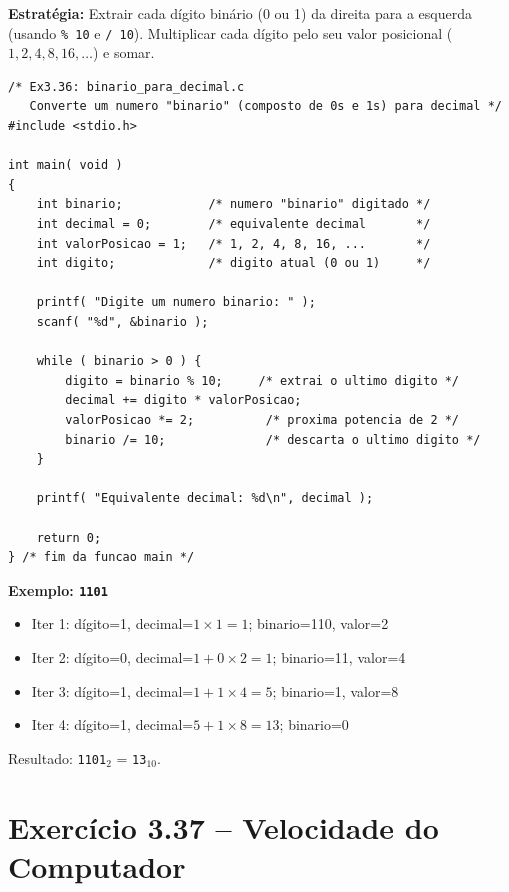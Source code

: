 \documentclass[12pt,a4paper]{article}
\begin{document}
\begin{respostabox}
\textbf{Estratégia:} Extrair cada dígito binário (0 ou 1) da direita para a esquerda
(usando \texttt{\% 10} e \texttt{/ 10}). Multiplicar cada dígito pelo seu valor
posicional ($1, 2, 4, 8, 16, \ldots$) e somar.

\begin{lstlisting}
/* Ex3.36: binario_para_decimal.c
   Converte um numero "binario" (composto de 0s e 1s) para decimal */
#include <stdio.h>

int main( void )
{
    int binario;            /* numero "binario" digitado */
    int decimal = 0;        /* equivalente decimal       */
    int valorPosicao = 1;   /* 1, 2, 4, 8, 16, ...       */
    int digito;             /* digito atual (0 ou 1)     */

    printf( "Digite um numero binario: " );
    scanf( "%d", &binario );

    while ( binario > 0 ) {
        digito = binario % 10;     /* extrai o ultimo digito */
        decimal += digito * valorPosicao;
        valorPosicao *= 2;          /* proxima potencia de 2 */
        binario /= 10;              /* descarta o ultimo digito */
    }

    printf( "Equivalente decimal: %d\n", decimal );

    return 0;
} /* fim da funcao main */
\end{lstlisting}

\textbf{Exemplo: \texttt{1101}}
\begin{itemize}[noitemsep]
  \item Iter 1: dígito=1, decimal=$1 \times 1=1$; binario=110, valor=2
  \item Iter 2: dígito=0, decimal=$1 + 0 \times 2 = 1$; binario=11, valor=4
  \item Iter 3: dígito=1, decimal=$1 + 1 \times 4 = 5$; binario=1, valor=8
  \item Iter 4: dígito=1, decimal=$5 + 1 \times 8 = 13$; binario=0
\end{itemize}
Resultado: \texttt{1101}$_2$ = \texttt{13}$_{10}$. \checkmark
\end{respostabox}

\newpage

\section{Exercício 3.37 -- Velocidade do Computador}
\end{document}
